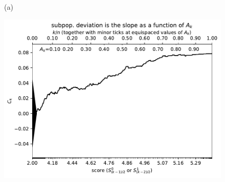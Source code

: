 \documentclass{article}
\newlength{\vertsep}
\newlength{\imsize}
\begin{document}
\begin{figure}
\begin{centering}

(a)
\parbox{\imsize}{\includegraphics[width=\imsize]
{../codes/weighted/County_of_San_Francisco_vs_Kern-LNGI/cumulative.pdf}}

\vspace{\vertsep}


\end{centering}
\end{figure}
\end{document}
